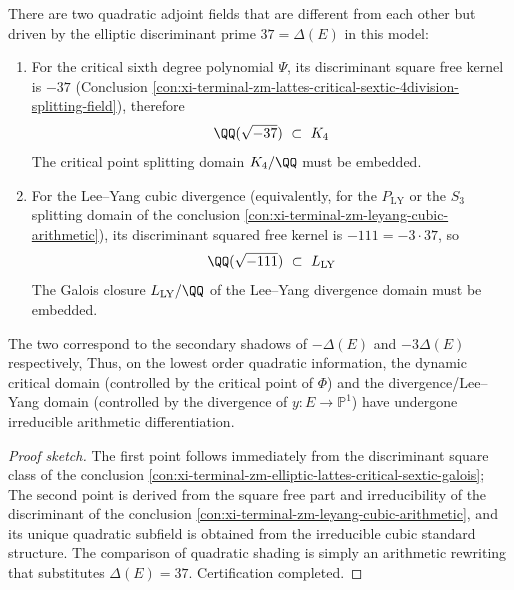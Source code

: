 \begin{conclusion}\label{con:xi-terminal-zm-quadratic-companion-fields-separation}
There are two quadratic adjoint fields that are different from each other but driven by the elliptic discriminant prime \(37=\Delta(E)\) in this model:
\begin{enumerate}
\item For the critical sixth degree polynomial \(\Psi\), its discriminant square free kernel is \(-37\) (Conclusion \ref{con:xi-terminal-zm-lattes-critical-sextic-4division-splitting-field}), therefore
  \[
  \QQ(\sqrt{-37})\ \subset\ K_4
  \]
The critical point splitting domain \(K_4/\QQ\) must be embedded.
\item For the Lee--Yang cubic divergence (equivalently, for the \(P_{\mathrm{LY}}\) or the \(S_3\) splitting domain of the conclusion \ref{con:xi-terminal-zm-leyang-cubic-arithmetic}), its discriminant squared free kernel is \(-111=-3\cdot 37\), so
  \[
  \QQ(\sqrt{-111})\ \subset\ L_{\mathrm{LY}}
  \]
The Galois closure \(L_{\mathrm{LY}}/\QQ\) of the Lee--Yang divergence domain must be embedded.
\end{enumerate}
The two correspond to the secondary shadows of \(-\Delta(E)\) and \(-3\Delta(E)\) respectively,
Thus, on the lowest order quadratic information, the dynamic critical domain (controlled by the critical point of \(\Phi\)) and the divergence/Lee--Yang domain (controlled by the divergence of \(y:E\to\mathbb P^{1}\)) have undergone irreducible arithmetic differentiation.
\end{conclusion}
\begin{proof}[Proof sketch]
The first point follows immediately from the discriminant square class of the conclusion \ref{con:xi-terminal-zm-elliptic-lattes-critical-sextic-galois};
The second point is derived from the square free part and irreducibility of the discriminant of the conclusion \ref{con:xi-terminal-zm-leyang-cubic-arithmetic}, and its unique quadratic subfield is obtained from the irreducible cubic standard structure.
The comparison of quadratic shading is simply an arithmetic rewriting that substitutes \(\Delta(E)=37\). Certification completed.
\end{proof}

